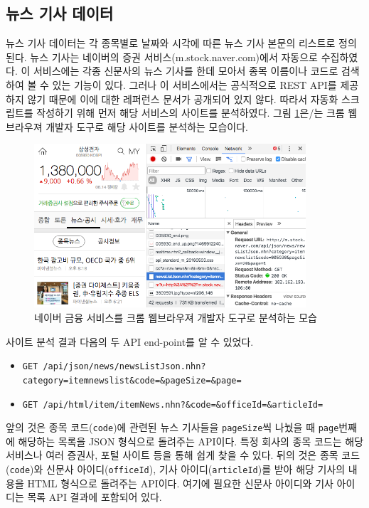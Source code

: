 \documentclass[a4paper,10pt]{article}
\begin{document}
\subsection{뉴스 기사 데이터}

뉴스 기사 데이터는 각 종목별로 날짜와 시각에 따른 뉴스 기사 본문의 리스트로 정의된다.
뉴스 기사는 네이버의 증권 서비스(m.stock.naver.com)에서 자동으로 수집하였다.
이 서비스에는 각종 신문사의 뉴스 기사를 한데 모아서 종목 이름이나 코드로 검색하여 볼 수 있는 기능이 있다.
그러나 이 서비스에서는 공식적으로 REST API를 제공하지 않기 때문에 이에 대한 레퍼런스 문서가 공개되어 있지 않다.
따라서 자동화 스크립트를 작성하기 위해 먼저 해당 서비스의 사이트를 분석하였다.
그림 \ref{fig:naver_stock}은/는 크롬 웹브라우져 개발자 도구로 해당 사이트를 분석하는 모습이다.
\begin{figure}[h]
\includegraphics[width=0.9\textwidth]{naver_stock}
\centering
\caption{네이버 금융 서비스를 크롬 웹브라우져 개발자 도구로 분석하는 모습}
\label{fig:naver_stock}
\end{figure}
사이트 분석 결과 다음의 두 API end-point를 알 수 있었다.
\begin{itemize}
\item \texttt{GET /api/json/news/newsListJson.nhn?category=itemnewslist\&code=\&pageSize=\&page=}
\item \texttt{GET /api/html/item/itemNews.nhn?\&code=\&officeId=\&articleId=}
\end{itemize}
앞의 것은 종목 코드(\texttt{code})에 관련된 뉴스 기사들을 \texttt{pageSize}씩 나눴을 때 \texttt{page}번째에 해당하는 목록을 JSON 형식으로 돌려주는 API이다.
특정 회사의 종목 코드는 해당 서비스나 여러 증권사, 포털 사이트 등을 통해 쉽게 찾을 수 있다.
뒤의 것은 종목 코드(\texttt{code})와 신문사 아이디(\texttt{officeId}), 기사 아이디(\texttt{articleId})를 받아 해당 기사의 내용을 HTML 형식으로 돌려주는 API이다.
여기에 필요한 신문사 아이디와 기사 아이디는 목록 API 결과에 포함되어 있다.
\end{document}
